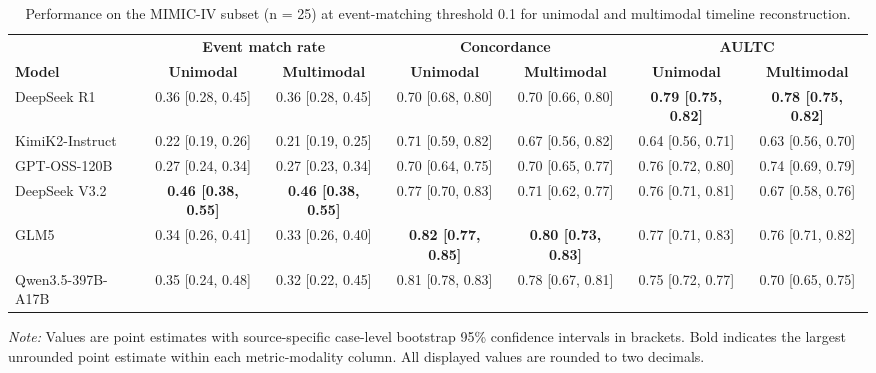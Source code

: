 \begin{table}[htbp]
\caption{Performance on the MIMIC-IV subset (n = 25) at event-matching threshold 0.1 for unimodal and multimodal timeline reconstruction.}
\ChEightTableBodyStart
\begin{ChEightFloatBody}


\centering
\scriptsize
\begin{adjustbox}{max width=\textwidth}
\begin{tabular}{@{}lcccccc@{}}
\toprule
& \multicolumn{2}{c}{\textbf{Event match rate}} & \multicolumn{2}{c}{\textbf{Concordance}} & \multicolumn{2}{c}{\textbf{AULTC}} \\
\cmidrule(lr){2-3}\cmidrule(lr){4-5}\cmidrule(l){6-7}
\textbf{Model} & \textbf{Unimodal} & \textbf{Multimodal} & \textbf{Unimodal} & \textbf{Multimodal} & \textbf{Unimodal} & \textbf{Multimodal} \\
\midrule
DeepSeek R1 & 0.36 [0.28, 0.45] & 0.36 [0.28, 0.45] & 0.70 [0.68, 0.80] & 0.70 [0.66, 0.80] & \textbf{0.79 [0.75, 0.82]} & \textbf{0.78 [0.75, 0.82]} \\
KimiK2-Instruct & 0.22 [0.19, 0.26] & 0.21 [0.19, 0.25] & 0.71 [0.59, 0.82] & 0.67 [0.56, 0.82] & 0.64 [0.56, 0.71] & 0.63 [0.56, 0.70] \\
GPT-OSS-120B & 0.27 [0.24, 0.34] & 0.27 [0.23, 0.34] & 0.70 [0.64, 0.75] & 0.70 [0.65, 0.77] & 0.76 [0.72, 0.80] & 0.74 [0.69, 0.79] \\
DeepSeek V3.2 & \textbf{0.46 [0.38, 0.55]} & \textbf{0.46 [0.38, 0.55]} & 0.77 [0.70, 0.83] & 0.71 [0.62, 0.77] & 0.76 [0.71, 0.81] & 0.67 [0.58, 0.76] \\
GLM5 & 0.34 [0.26, 0.41] & 0.33 [0.26, 0.40] & \textbf{0.82 [0.77, 0.85]} & \textbf{0.80 [0.73, 0.83]} & 0.77 [0.71, 0.83] & 0.76 [0.71, 0.82] \\
Qwen3.5-397B-A17B & 0.35 [0.24, 0.48] & 0.32 [0.22, 0.45] & 0.81 [0.78, 0.83] & 0.78 [0.67, 0.81] & 0.75 [0.72, 0.77] & 0.70 [0.65, 0.75] \\
\bottomrule
\end{tabular}
\end{adjustbox}
\par
\begin{minipage}{\textwidth}
\footnotesize\textit{Note:} Values are point estimates with source-specific case-level bootstrap 95\% confidence intervals in brackets. Bold indicates the largest unrounded point estimate within each metric-modality column. All displayed values are rounded to two decimals.
\end{minipage}

\end{ChEightFloatBody}
\end{table}